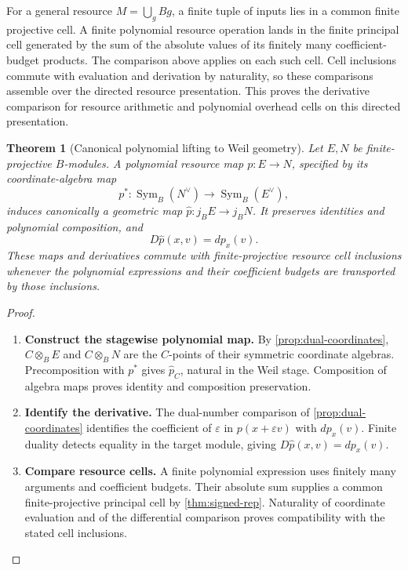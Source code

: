 \documentclass[11pt,a4paper]{article}
\numberwithin{algorithm}{section}
\numberwithin{equation}{section}
\newtheorem{theorem}{Theorem}[section]
\theoremstyle{definition}
\theoremstyle{remark}
\theoremstyle{plain}
\newcommand{\eps}{\varepsilon}
\newcommand{\Sym}{\operatorname{Sym}}
\theoremstyle{definition}
\theoremstyle{plain}
\begin{document}
For a general resource $M=\bigcup_g Bg$, a finite tuple of inputs lies in a common finite projective cell. A finite polynomial resource operation lands in the finite principal cell generated by the sum of the absolute values of its finitely many coefficient-budget products. The comparison above applies on each such cell. Cell inclusions commute with evaluation and derivation by naturality, so these comparisons assemble over the directed resource presentation. This proves the derivative comparison for resource arithmetic and polynomial overhead cells on this directed presentation.


\begin{theorem}[Canonical polynomial lifting to Weil geometry]
\label{thm:polynomial-lift}
Let $E,N$ be finite-projective $B$-modules.  A polynomial resource
map $p:E\to N$, specified by its coordinate-algebra map
\[
 p^*:\Sym_B(N^\vee)\longrightarrow\Sym_B(E^\vee),
\]
induces canonically a geometric map
$\widehat p:j_BE\to j_BN$.  It preserves identities and
polynomial composition, and
\[
 D\widehat p(x,v)=dp_x(v).
\]
These maps and derivatives commute with finite-projective resource
cell inclusions whenever the polynomial expressions and their
coefficient budgets are transported by those inclusions.
\end{theorem}
\begin{proof}\leavevmode
\begin{enumerate}[leftmargin=*,align=left]
\item \textbf{Construct the stagewise polynomial map.}
By \cref{prop:dual-coordinates}, $C\otimes_BE$ and
$C\otimes_BN$ are the $C$-points of their symmetric coordinate
algebras. Precomposition with $p^*$ gives $\widehat p_C$,
natural in the Weil stage. Composition of algebra maps proves
identity and composition preservation.

\item \textbf{Identify the derivative.}
The dual-number comparison of \cref{prop:dual-coordinates}
identifies the coefficient of $\eps$ in $p(x+\eps v)$ with
$dp_x(v)$. Finite duality detects equality in the target module,
giving $D\widehat p(x,v)=dp_x(v)$.

\item \textbf{Compare resource cells.}
A finite polynomial expression uses finitely many arguments and
coefficient budgets. Their absolute sum supplies a common
finite-projective principal cell by \cref{thm:signed-rep}.
Naturality of coordinate evaluation and of the differential
comparison proves compatibility with the stated cell inclusions.
\end{enumerate}
\end{proof}
\end{document}
